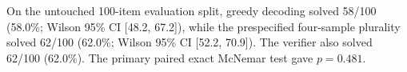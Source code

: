 On the untouched 100-item evaluation split, greedy decoding solved 58/100 (58.0\%; Wilson 95\% CI [48.2, 67.2]), while the prespecified four-sample plurality solved 62/100 (62.0\%; Wilson 95\% CI [52.2, 70.9]). The verifier also solved 62/100 (62.0\%). The primary paired exact McNemar test gave $p=0.481$.
